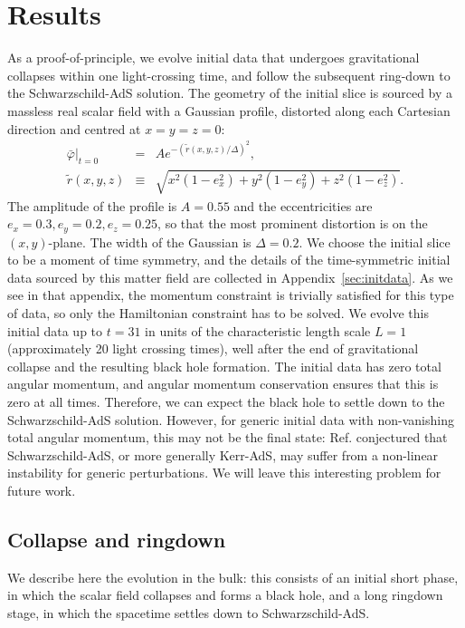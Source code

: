 \documentclass[aps,letterpaper,twocolumn,nofootinbib]{revtex4}
\numberwithin{equation}{section}
\begin{document}
\section{Results}\label{sec:results}

As a proof-of-principle, we evolve initial data that undergoes gravitational collapses within one light-crossing time, and follow the subsequent ring-down to the Schwarzschild-AdS solution.
The geometry of the initial slice is sourced by a massless real scalar field with a Gaussian profile, distorted along each Cartesian direction and centred at $x=y=z=0$:
\begin{eqnarray}
\label{eq:scaGaupro}
\bar{\varphi}\big|_{t=0}&=&A e^{-(\tilde{r}(x,y,z)/\Delta)^2},\\
\tilde{r}(x,y,z)&\equiv&\sqrt{ x^2(1-e_x^2)+ y^2(1-e_y^2)+ z^2(1-e_z^2)}. \nonumber
\end{eqnarray}
The amplitude of the profile is $A=0.55$ and the eccentricities are $e_x=0.3, e_y=0.2, e_z=0.25$, so that the most prominent distortion is on the $(x,y)$-plane. The width of the Gaussian is $\Delta=0.2$. 
We choose the initial slice to be a moment of time symmetry, and the details of the time-symmetric initial data sourced by this matter field are collected in Appendix~\ref{sec:initdata}. 
As we see in that appendix, the momentum constraint is trivially satisfied for this type of data, so only the Hamiltonian constraint has to be solved. We evolve this initial data up to $t=31$ in units of the characteristic length scale $L=1$ (approximately 20 light crossing times), well after the end of gravitational collapse and the resulting black hole formation. 
The initial data has zero total angular momentum, 
and angular momentum conservation \cite{Fischetti:2012rd} ensures that this is zero at all times. 
Therefore, we can expect the black hole to settle down to the Schwarzschild-AdS solution. However, for generic initial data with non-vanishing total angular momentum, this may not be the final state: Ref. \cite{Holzegel:2011uu} conjectured that Schwarzschild-AdS, or more generally Kerr-AdS, may suffer from a non-linear instability for generic perturbations.
We will leave this interesting problem for future work.

\subsection{Collapse and ringdown}\label{sec:rescolring}

We describe here the evolution in the bulk: this consists of an initial short phase, in which the scalar field collapses and forms a black hole, and a long ringdown stage, in which the spacetime settles down to Schwarzschild-AdS. 
\end{document}
